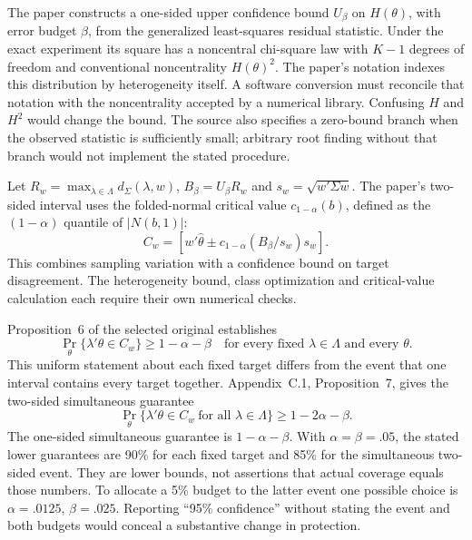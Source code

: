 The paper constructs a one-sided upper confidence bound $U_\beta$ on
$H(\theta)$, with error budget $\beta$, from the generalized least-squares
residual statistic. Under the exact experiment its square has a noncentral
chi-square law with $K-1$ degrees of freedom and conventional noncentrality
$H(\theta)^2$. The paper's notation indexes this distribution by
heterogeneity itself. A software conversion must reconcile that notation with
the noncentrality accepted by a numerical library. Confusing $H$ and $H^2$
would change the bound. The source also specifies a zero-bound branch when
the observed statistic is sufficiently small; arbitrary root finding without
that branch would not implement the stated procedure.

Let $R_w=\max_{\lambda\in\Lambda}d_\Sigma(\lambda,w)$,
$B_\beta=U_\beta R_w$ and $s_w=\sqrt{w'\Sigma w}$. The paper's two-sided
interval uses the folded-normal critical value $c_{1-\alpha}(b)$, defined as
the $(1-\alpha)$ quantile of $|N(b,1)|$:
\begin{equation}
 C_w=\left[ w'\widehat\theta
       \mathbin{\pm}c_{1-\alpha}(B_\beta/s_w)s_w\right].
 \label{exec22:targets-ci}
\end{equation}
This combines sampling variation with a confidence bound on target
disagreement. The heterogeneity bound, class optimization and critical-value
calculation each require their own numerical checks.

Proposition~6 of the selected original establishes
\begin{equation}
 \Pr_\theta\{\lambda'\theta\in C_w\}\geq1-\alpha-\beta
 \quad\text{for every fixed }\lambda\in\Lambda\text{ and every }\theta.
 \label{exec22:targets-point}
\end{equation}
This uniform statement about each fixed target differs from the event that
one interval contains every target together. Appendix~C.1, Proposition~7,
gives the two-sided simultaneous guarantee
\begin{equation}
 \Pr_\theta\{\lambda'\theta\in C_w\ \text{for all }\lambda\in\Lambda\}
    \geq1-2\alpha-\beta.
 \label{exec22:targets-set}
\end{equation}
The one-sided simultaneous guarantee is $1-\alpha-\beta$. With
$\alpha=\beta=.05$, the stated lower guarantees are 90\% for each fixed
target and 85\% for the simultaneous two-sided event. They are lower bounds,
not assertions that actual coverage equals those numbers. To allocate a 5\%
budget to the latter event one possible choice is
$\alpha=.0125$, $\beta=.025$. Reporting ``95\% confidence'' without stating
the event and both budgets would conceal a substantive change in protection.

